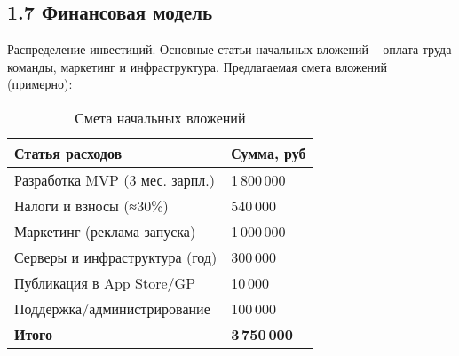 \subsection*{1.7 Финансовая модель}
Распределение инвестиций. Основные статьи начальных вложений – оплата труда команды, маркетинг и инфраструктура. Предлагаемая смета вложений (примерно):

\begin{table}[h]
\centering
\begin{tabular}{| p{95mm} | p{35mm} |}
\hline
\textbf{Статья расходов} & \textbf{Сумма, руб} \\
\hline
Разработка MVP (3 мес. зарпл.) & 1\,800\,000 \\
\hline
Налоги и взносы (≈30\%) & 540\,000 \\
\hline
Маркетинг (реклама запуска) & 1\,000\,000 \\
\hline
Серверы и инфраструктура (год) & 300\,000 \\
\hline
Публикация в App Store/GP & 10\,000 \\
\hline
Поддержка/администрирование & 100\,000 \\
\hline
\textbf{Итого} & \textbf{3\,750\,000} \\
\hline
\end{tabular}
\caption{Смета начальных вложений}
\end{table}


